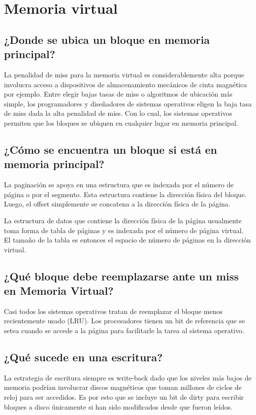 \section{Memoria virtual}

\subsection{¿Donde se ubica un bloque en memoria principal?}
La penalidad de miss para la memoria virtual es considerablemente alta porque involucra acceso a dispositivos de almacenamiento mecánicos de cinta magnética por ejemplo. Entre elegir bajas tasas de miss o algoritmos de ubicación más simple, los programadores y diseñadores de sistemas operativos eligen la baja tasa de miss dada la alta penalidad de miss. Con lo cual, los sistemas operativos permiten que los bloques se ubiquen en cualquier lugar en memoria principal.


\subsection{¿Cómo se encuentra un bloque si está en memoria principal?}
La paginación se apoya en una estructura que es indexada por el número de página o por el segmento. Esta estructura contiene la dirección física del bloque. Luego, el offset simplemente se concatena a la dirección física de la página.

La estructura de datos que contiene la dirección física de la página usualmente toma forma de tabla de páginas y es indexada por el número de página virtual. El tamaño de la tabla es entonces el espacio de número de páginas en la dirección virtual.

\subsection{¿Qué bloque debe reemplazarse ante un miss en Memoria Virtual?}
Casi todos los sistemas operativos tratan de reemplazar el bloque menos recientemente usado (LRU). Los procesadores tienen un bit de referencia que se setea cuando se accede a la página para facilitarle la tarea al sistema operativo.

\subsection{¿Qué sucede en una escritura?}
La estrategia de escritura siempre es write-back dado que los niveles más bajos de memoria podrían involucrar discos magnéticos que toman millones de ciclos de reloj para ser accedidos. Es por esto que se incluye un bit de dirty para escribir bloques a disco únicamente si han sido modificados desde que fueron leídos.


